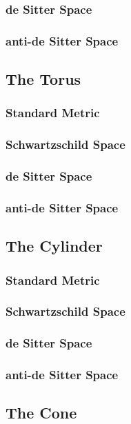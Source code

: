 \documentclass{article}
\begin{document}
\subsubsection{de Sitter Space}
\subsubsection{anti-de Sitter Space}

\newpage
\subsection{The Torus}
\subsubsection{Standard Metric}
\subsubsection{Schwartzschild Space}
\subsubsection{de Sitter Space}
\subsubsection{anti-de Sitter Space}

\newpage
\subsection{The Cylinder}
\subsubsection{Standard Metric}
\subsubsection{Schwartzschild Space}
\subsubsection{de Sitter Space}
\subsubsection{anti-de Sitter Space}

\newpage
\subsection{The Cone}
\end{document}
